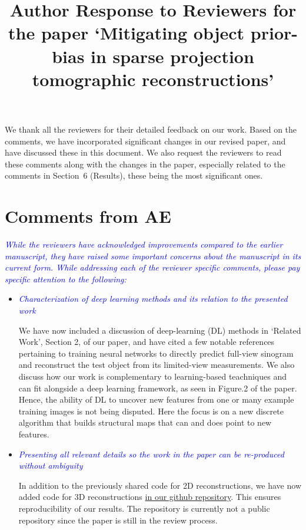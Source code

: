 \documentclass[11pt]{article}
\title{Author Response to Reviewers for the paper `Mitigating object
  prior-bias in sparse projection tomographic reconstructions'}
\begin{document}
\date{}
\maketitle


We thank all the reviewers for their detailed feedback on our
work. Based on the comments, we have incorporated significant changes
in our revised paper, and have discussed these in this document. We
also request the reviewers to read these comments along with the
changes in the paper, especially related to the comments in Section~6
(Results), these being the most significant ones.


\section{Comments from AE}

\textcolor{blue}{\textit{While the reviewers have acknowledged
    improvements compared to the earlier manuscript, they have raised
    some important concerns about the manuscript in its current
    form. While addressing each of the reviewer specific comments,
    please pay specific attention to the following:}} 

  \begin{itemize}
  \item \textcolor{blue}{\textit{Characterization of deep learning
        methods and its relation to the presented work}} 

    We have now included a discussion of deep-learning (DL) methods in
    `Related Work', Section 2, of our paper, and have cited a few
    notable references pertaining to training neural networks to
    directly predict full-view sinogram and reconstruct the test
    object from its limited-view measurements. We also discuss how
    our work is complementary to learning-based teachniques and can
    fit alongside a deep learning framework, as seen in Figure.2 of the paper. Hence, the ability of DL to
    uncover new features from one or many example training images is not being disputed. Here the focus is on a new discrete algorithm that builds structural maps that can and does point to new features.
    

    \item\textcolor{blue}{\textit{Presenting all relevant details so
          the work in the paper can be re-produced without ambiguity}} 
      

      In addition to the previously shared code for 2D
      reconstructions, we have now added code for 3D reconstructions
      \href{https://github.com/preetigopal/Weighted-Prior-Tomographic-Reconstruction}{in
        our github repository}. This ensures reproducibility of our
      results. The repository is currently not a public repository
      since the paper is still in the review process.

  \end{itemize}
\end{document}
